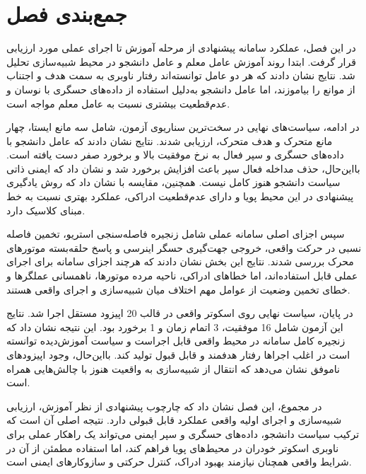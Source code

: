 \section{جمع‌بندی فصل}
\label{sec:chapter6_summary}

در این فصل، عملکرد سامانه پیشنهادی از مرحله آموزش تا اجرای عملی مورد ارزیابی قرار گرفت. ابتدا روند آموزش عامل معلم و عامل دانشجو در محیط شبیه‌سازی تحلیل شد. نتایج نشان دادند که هر دو عامل توانسته‌اند رفتار ناوبری به سمت هدف و اجتناب از موانع را بیاموزند، اما عامل دانشجو به‌دلیل استفاده از داده‌های حسگری با نوسان و عدم‌قطعیت بیشتری نسبت به عامل معلم مواجه است.

در ادامه، سیاست‌های نهایی در سخت‌ترین سناریوی آزمون، شامل سه مانع ایستا، چهار مانع متحرک و هدف متحرک، ارزیابی شدند. نتایج نشان دادند که عامل دانشجو با داده‌های حسگری و سپر فعال به نرخ موفقیت بالا و برخورد صفر دست یافته است. بااین‌حال، حذف مداخله فعال سپر باعث افزایش برخورد شد و نشان داد که ایمنی ذاتی سیاست دانشجو هنوز کامل نیست. همچنین، مقایسه با  نشان داد که روش یادگیری پیشنهادی در این محیط پویا و دارای عدم‌قطعیت ادراکی، عملکرد بهتری نسبت به خط مبنای کلاسیک دارد.

سپس اجزای اصلی سامانه عملی شامل زنجیره فاصله‌سنجی استریو، تخمین فاصله نسبی در حرکت واقعی، خروجی جهت‌گیری حسگر اینرسی و پاسخ حلقه‌بسته موتورهای محرک بررسی شدند. نتایج این بخش نشان دادند که هرچند اجزای سامانه برای اجرای عملی قابل استفاده‌اند، اما خطاهای ادراکی، ناحیه مرده موتورها، ناهمسانی عملگرها و خطای تخمین وضعیت از عوامل مهم اختلاف میان شبیه‌سازی و اجرای واقعی هستند.

در پایان، سیاست نهایی روی اسکوتر واقعی در قالب 20 اپیزود مستقل اجرا شد. نتایج این آزمون شامل 16 موفقیت، 3 اتمام زمان و 1 برخورد بود. این نتیجه نشان داد که زنجیره کامل سامانه در محیط واقعی قابل اجراست و سیاست آموزش‌دیده توانسته است در اغلب اجراها رفتار هدفمند و قابل قبول تولید کند. بااین‌حال، وجود اپیزودهای ناموفق نشان می‌دهد که انتقال از شبیه‌سازی به واقعیت هنوز با چالش‌هایی همراه است.

در مجموع، این فصل نشان داد که چارچوب پیشنهادی از نظر آموزش، ارزیابی شبیه‌سازی و اجرای اولیه واقعی عملکرد قابل قبولی دارد. نتیجه اصلی آن است که ترکیب سیاست دانشجو، داده‌های حسگری و سپر ایمنی می‌تواند یک راهکار عملی برای ناوبری اسکوتر خودران در محیط‌های پویا فراهم کند، اما استفاده مطمئن از آن در شرایط واقعی همچنان نیازمند بهبود ادراک، کنترل حرکتی و سازوکارهای ایمنی است.